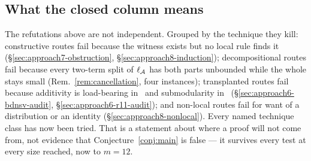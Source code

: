 \subsection*{What the closed column means}

The refutations above are not independent. Grouped by the technique they kill:
constructive routes fail because the witness exists but no local rule finds it
(\S\ref{sec:approach7-obstruction}, \S\ref{sec:approach8-induction});
decompositional routes fail because every two-term split of $\ell_{\mathcal{A}}$ has
both parts unbounded while the whole stays small (Rem.~\ref{rem:cancellation},
four instances); transplanted routes fail because additivity is load-bearing
in~\cite{BDNSV20} and submodularity in~\cite{LMS26}
(\S\ref{sec:approach6-bdnsv-audit}, \S\ref{sec:approach6-r11-audit}); and
non-local routes fail for want of a distribution or an identity
(\S\ref{sec:approach8-nonlocal}). Every named technique class has now been tried.
That is a statement about where a proof will not come from, not evidence that
Conjecture~\ref{conj:main} is false --- it survives every test at every size
reached, now to $m = 12$.
